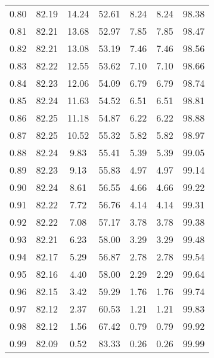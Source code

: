 \begin{tabular}{|c|c|c|c|c|c|c|}
      0.80 &     82.19 &     14.24 &      52.61 &    8.24 &       8.24 &         98.38 \\
      0.81 &     82.21 &     13.68 &      52.97 &    7.85 &       7.85 &         98.47 \\
      0.82 &     82.21 &     13.08 &      53.19 &    7.46 &       7.46 &         98.56 \\
      0.83 &     82.22 &     12.55 &      53.62 &    7.10 &       7.10 &         98.66 \\
      0.84 &     82.23 &     12.06 &      54.09 &    6.79 &       6.79 &         98.74 \\
      0.85 &     82.24 &     11.63 &      54.52 &    6.51 &       6.51 &         98.81 \\
      0.86 &     82.25 &     11.18 &      54.87 &    6.22 &       6.22 &         98.88 \\
      0.87 &     82.25 &     10.52 &      55.32 &    5.82 &       5.82 &         98.97 \\
      0.88 &     82.24 &      9.83 &      55.41 &    5.39 &       5.39 &         99.05 \\
      0.89 &     82.23 &      9.13 &      55.83 &    4.97 &       4.97 &         99.14 \\
      0.90 &     82.24 &      8.61 &      56.55 &    4.66 &       4.66 &         99.22 \\
      0.91 &     82.22 &      7.72 &      56.76 &    4.14 &       4.14 &         99.31 \\
      0.92 &     82.22 &      7.08 &      57.17 &    3.78 &       3.78 &         99.38 \\
      0.93 &     82.21 &      6.23 &      58.00 &    3.29 &       3.29 &         99.48 \\
      0.94 &     82.17 &      5.29 &      56.87 &    2.78 &       2.78 &         99.54 \\
      0.95 &     82.16 &      4.40 &      58.00 &    2.29 &       2.29 &         99.64 \\
      0.96 &     82.15 &      3.42 &      59.29 &    1.76 &       1.76 &         99.74 \\
      0.97 &     82.12 &      2.37 &      60.53 &    1.21 &       1.21 &         99.83 \\
      0.98 &     82.12 &      1.56 &      67.42 &    0.79 &       0.79 &         99.92 \\
      0.99 &     82.09 &      0.52 &      83.33 &    0.26 &       0.26 &         99.99 \\
\bottomrule
\end{tabular}
